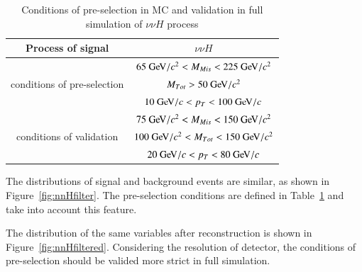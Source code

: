 \documentclass[11pt,a4paper]{cepcnote}
\begin{document}
\begin{table}[H]
  \begin{center}
  \begin{tabular}{|c|c|}
  \hline \hline
  Process of signal								&				$\nu\nu H$\\
  \hline
  \multirow{3}{*}{conditions of pre-selection}	&	$65\gev/c^2 < M_{Mis} < 225\gev/c^2$	\\
  												&	$M_{Tot} > 50\gev/c^2$\\
												&	$10\gev/c < p_{T} < 100\gev/c$	\\
  \hline
  \multirow{3}{*}{conditions of validation}		&	$75\gev/c^2 < M_{Mis} < 150\gev/c^2$	\\
  												&	$100\gev/c^2 < M_{Tot} < 150\gev/c^2$	\\
												&	$20\gev/c < p_{T} < 80\gev/c$	\\
  \hline \hline
  \end{tabular}
  \caption[]{Conditions of pre-selection in MC and validation in full simulation of $\nu\nu H$ process}
 \end{center}
  \label{tab:nnhprecut}
\end{table}
The distributions of signal and background events are similar, as shown in
Figure~\ref{fig:nnHfilter}. The pre-selection conditions are defined in
Table~\ref{tab:nnhprecut} and take into account this feature.

The distribution of the same variables after reconstruction is shown in
Figure~\ref{fig:nnHfiltered}.
{\color{blue} Considering the resolution of detector, the conditions of pre-selection should be valided more strict in full simulation.}
\end{document}
